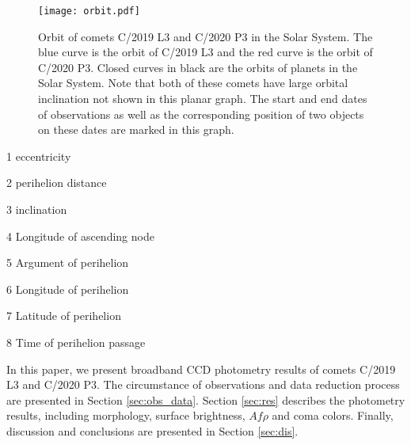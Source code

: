 \begin{figure}
    \centering
    \texttt{[image: orbit.pdf]}
    \caption{Orbit of comets C/2019 L3 and C/2020 P3 in the Solar System. The blue curve is the orbit of C/2019 L3 and the red curve is the orbit of C/2020 P3. Closed curves in black are the orbits of planets in the Solar System. Note that both of these comets have large orbital inclination not shown in this planar graph. The start and end dates of observations as well as the corresponding position of two objects on these dates are marked in this graph. }
    \label{fig:orbit}
\end{figure}

\begin{table}
    \centering
    \caption{Orbital elements of comets C/2019 L3 and C/2020 P3 (Epoch: ). }\label{tab:orb_elem}
    \begin{threeparttable}
        \begin{tablenotes}
            \item[1] eccentricity 
            \item[2] perihelion distance
            \item[3] inclination
            \item[4] Longitude of ascending node
            \item[5] Argument of perihelion
            \item[6] Longitude of perihelion
            \item[7] Latitude of perihelion
            \item[8] Time of perihelion passage
        \end{tablenotes}
    \end{threeparttable}
\end{table}

In this paper, we present broadband CCD photometry results of comets C/2019 L3 and C/2020 P3. The circumstance of observations and data reduction process are presented in Section \ref{sec:obs_data}. Section \ref{sec:res} describes the photometry results, including morphology, surface brightness, $Af\rho$ and coma colors. Finally, discussion and conclusions are presented in Section \ref{sec:dis}. 

